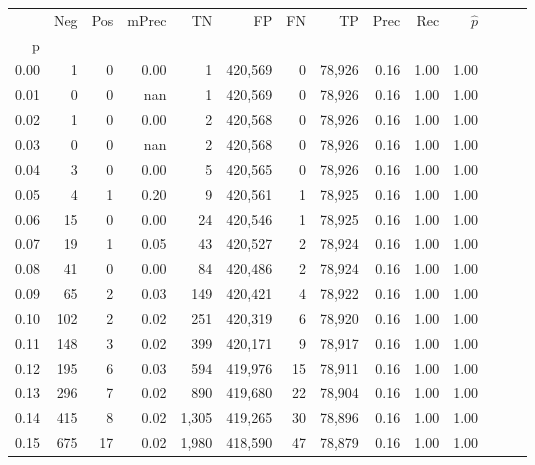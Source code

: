 \begin{tabular}{rrrrrrrrrrrrrr}
\toprule
{} &     Neg &    Pos & mPrec &       TN &       FP &      FN &      TP &  Prec &   Rec & $\hat{p}$ \\
p    &         &        &       &          &          &         &         &       &       &           \\
\midrule
0.00 &       1 &      0 &  0.00 &        1 &  420,569 &       0 &  78,926 &  0.16 &  1.00 &      1.00 \\
0.01 &       0 &      0 &   nan &        1 &  420,569 &       0 &  78,926 &  0.16 &  1.00 &      1.00 \\
0.02 &       1 &      0 &  0.00 &        2 &  420,568 &       0 &  78,926 &  0.16 &  1.00 &      1.00 \\
0.03 &       0 &      0 &   nan &        2 &  420,568 &       0 &  78,926 &  0.16 &  1.00 &      1.00 \\
0.04 &       3 &      0 &  0.00 &        5 &  420,565 &       0 &  78,926 &  0.16 &  1.00 &      1.00 \\
0.05 &       4 &      1 &  0.20 &        9 &  420,561 &       1 &  78,925 &  0.16 &  1.00 &      1.00 \\
0.06 &      15 &      0 &  0.00 &       24 &  420,546 &       1 &  78,925 &  0.16 &  1.00 &      1.00 \\
0.07 &      19 &      1 &  0.05 &       43 &  420,527 &       2 &  78,924 &  0.16 &  1.00 &      1.00 \\
0.08 &      41 &      0 &  0.00 &       84 &  420,486 &       2 &  78,924 &  0.16 &  1.00 &      1.00 \\
0.09 &      65 &      2 &  0.03 &      149 &  420,421 &       4 &  78,922 &  0.16 &  1.00 &      1.00 \\
0.10 &     102 &      2 &  0.02 &      251 &  420,319 &       6 &  78,920 &  0.16 &  1.00 &      1.00 \\
0.11 &     148 &      3 &  0.02 &      399 &  420,171 &       9 &  78,917 &  0.16 &  1.00 &      1.00 \\
0.12 &     195 &      6 &  0.03 &      594 &  419,976 &      15 &  78,911 &  0.16 &  1.00 &      1.00 \\
0.13 &     296 &      7 &  0.02 &      890 &  419,680 &      22 &  78,904 &  0.16 &  1.00 &      1.00 \\
0.14 &     415 &      8 &  0.02 &    1,305 &  419,265 &      30 &  78,896 &  0.16 &  1.00 &      1.00 \\
0.15 &     675 &     17 &  0.02 &    1,980 &  418,590 &      47 &  78,879 &  0.16 &  1.00 &      1.00 \\

\end{tabular}
